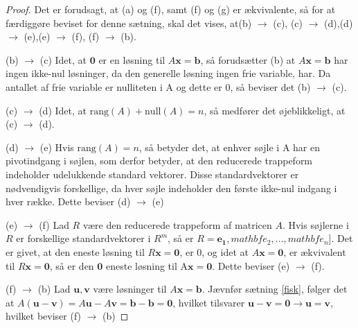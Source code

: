 \begin{proof}
\noindent
Det er forudsagt, at (a) og (f), samt (f) og (g) er ækvivalente, så for at færdiggøre beviset for denne sætning, skal det vises, at(b) $\rightarrow$ (c), (c) $\rightarrow$ (d),(d) $\rightarrow$ (e),(e) $\rightarrow$ (f), (f) $\rightarrow$ (b).
%

\itemize 
\item (b) $\rightarrow$ (c) 
Idet, at $\mathbf{0}$ er en løsning til $A\mathbf{x}=\mathbf{b}$, så forudsætter (b) at $A\mathbf{x}=\mathbf{b}$ har ingen ikke-nul løsninger, da den generelle løsning ingen frie variable, har. Da antallet af frie variable er nulliteten i A og dette er 0, så beviser det (b) $\rightarrow$ (c). 

\item (c) $\rightarrow$ (d)
Idet, at $\text{rang}(A)+\text{null}(A)=n$, så medfører det øjeblikkeligt, at (c) $\rightarrow$ (d).


\item (d) $\rightarrow$ (e)
Hvis $\text{rang}(A)=n$, så betyder det, at enhver søjle i A har en pivotindgang i søjlen, som derfor betyder, at den reducerede trappeform indeholder udelukkende standard vektorer. Disse standardvektorer er nødvendigvis forskellige, da hver søjle indeholder den første ikke-nul indgang i hver række. Dette beviser (d) $\rightarrow$ (e)


\item (e) $\rightarrow$ (f)
Lad $R$ være den reducerede trappeform af matricen $A$. Hvis søjlerne i $R$ er forskellige standardvektorer i $R^m$, så er $R=\mathbf{e_1}, mathbf{e_2}, \ldots, mathbf{e_n}]$. Det er givet, at den eneste løsning til $R\mathbf{x}=\mathbf{0}$, er 0, og idet at $A\mathbf{x}=\mathbf{0}$, er ækvivalent til $R\mathbf{x}=\mathbf{0}$, så er den $\mathbf{0}$ eneste løsning til A$\mathbf{x}=\mathbf{0}$. Dette beviser (e) $\rightarrow$ (f).
 
\item (f) $\rightarrow$ (b)
Lad $\mathbf{u}, \mathbf{v}$ være løsninger til $A\mathbf{x}=\mathbf{b}$.
Jævnfør sætning \ref{fisk}, følger det at $A(\mathbf{u}-\mathbf{v})=A\mathbf{u}-A\mathbf{v}=\mathbf{b}-\mathbf{b}=\mathbf{0}$, hvilket tilsvarer $\mathbf{u}-\mathbf{v}=\mathbf{0}
\rightarrow  
\mathbf{u} =\mathbf{v}$, hvilket beviser (f) $\rightarrow$ (b)

\end{proof}
%
